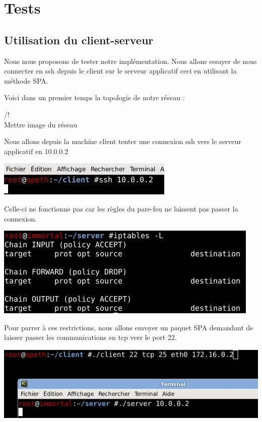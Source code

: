 \chapter{Tests}

\section{Utilisation du client-serveur}

Nous nous proposons de tester notre implémentation. Nous allons essayer de nous connecter en ssh depuis le client sur le serveur applicatif ceci en utilisant la méthode SPA.

Voici dans un premier temps la topologie de notre réseau :

/!\\ Mettre image du réseau

Nous allons depuis la machine client tenter une connexion ssh vers le serveur applicatif en 10.0.0.2

\includegraphics[scale=1]{test_ssh.jpeg}

Celle-ci ne fonctionne pas car les règles du pare-feu ne laissent pas passer la connexion.

\includegraphics[scale=1]{regles_ip_avant.jpeg}

Pour parrer à ces restrictions, nous allons envoyer un paquet SPA demandant de laisser passer les communications en tcp vers le port 22.

\includegraphics[scale=1]{execution_client.jpeg}

